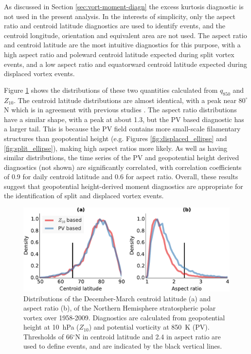 As discussed in Section \ref{sec:vort-moment-diagn} the excess kurtosis
diagnostic is not used in the present analysis. In the interests of simplicity,
only the aspect ratio and centroid latitude diagnostics are used to identify
events, and the centroid longitude, orientation and equivalent area are not
used. The aspect ratio and centroid latitude are the most intuitive diagnostics
for this purpose, with a high aspect ratio and poleward centroid latitude
expected during split vortex events, and a low aspect ratio and equatorward
centroid latitude expected during displaced vortex events. 

Figure \ref{fig:pv_z_moments_distribution} shows the distributions of these two
quantities calculated from $q_{850}$ and $Z_{10}$. The centroid latitude
distributions are almost identical, with a peak near $80^{\circ}$N which is in
agreement with previous studies \citep{Mitchell2011,Waugh1999}. The aspect ratio
distributions have a similar shape, with a peak at about 1.3, but the PV based
diagnostic has a larger tail. This is because the PV field contains more
small-scale filamentary structures than geopotential height (e.g. Figures
\ref{fig:displaced_ellipse} and \ref{fig:split_ellipse}), making high aspect
ratios more likely. As well as having similar distributions, the time series of
the PV and geopotential height derived diagnostics (not shown) are significantly
correlated, with correlation coefficients of 0.9 for daily centroid latitude and
0.6 for aspect ratio. Overall, these results suggest that geopotential
height-derived moment diagnostics are appropriate for the identification of
split and displaced vortex events. 

\begin{figure}
  \centering
  \includegraphics[width=\textwidth]{figures/chapter-moments/moments_distribution_crop.pdf}
  \caption[Distributions of $Z_{10}$ and PV-based moment
  diagnostics.]{Distributions of the December-March centroid latitude (a) and
    aspect ratio (b), of the Northern Hemisphere stratospheric polar vortex over
    1958-2009. Diagnostics are calculated from geopotential height at 10~hPa
    ($Z_{10}$) and potential vorticity at 850~K (PV). Thresholds of
    66$^{\circ}$N in centroid latitude and 2.4 in aspect ratio are used to
    define events, and are indicated by the black vertical lines.}
  \label{fig:pv_z_moments_distribution}
\end{figure}


